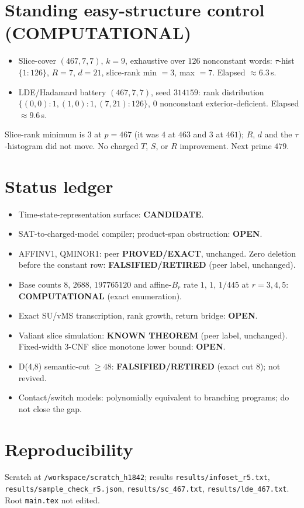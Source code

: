 \documentclass[11pt]{article}
\begin{document}
\section*{Standing easy-structure control (COMPUTATIONAL)}
\begin{itemize}
\item Slice-cover $(467,7,7)$, $k=9$, exhaustive over $126$ nonconstant words: $\tau$-hist $\{1{:}126\}$, $R=7$, $d=21$, slice-rank min $=3$, max $=7$. Elapsed $\approx6.3$\,s.
\item LDE/Hadamard battery $(467,7,7)$, seed $314159$: rank distribution $\{(0,0){:}1,(1,0){:}1,(7,21){:}126\}$, $0$ nonconstant exterior-deficient. Elapsed $\approx9.6$\,s.
\end{itemize}
Slice-rank minimum is $3$ at $p=467$ (it was $4$ at $463$ and $3$ at $461$); $R$, $d$ and the $\tau$-histogram did not move. No charged $T$, $S$, or $R$ improvement. Next prime $479$.

\section*{Status ledger}
\begin{itemize}
\item Time-state-representation surface: \textbf{CANDIDATE}.
\item SAT-to-charged-model compiler; product-span obstruction: \textbf{OPEN}.
\item AFFINV1, QMINOR1: peer \textbf{PROVED/EXACT}, unchanged. Zero deletion before the constant row: \textbf{FALSIFIED/RETIRED} (peer label, unchanged).
\item Base counts $8$, $2688$, $197765120$ and affine-$B_r$ rate $1$, $1$, $1/445$ at $r=3,4,5$: \textbf{COMPUTATIONAL} (exact enumeration).
\item Exact SU/vMS transcription, rank growth, return bridge: \textbf{OPEN}.
\item Valiant slice simulation: \textbf{KNOWN THEOREM} (peer label, unchanged). Fixed-width 3-CNF slice monotone lower bound: \textbf{OPEN}.
\item D(4,8) semantic-cut $\ge48$: \textbf{FALSIFIED/RETIRED} (exact cut 8); not revived.
\item Contact/switch models: polynomially equivalent to branching programs; do not close the gap.
\end{itemize}

\section*{Reproducibility}
Scratch at \texttt{/workspace/scratch\_h1842}; results \texttt{results/infoset\_r5.txt}, \texttt{results/sample\_check\_r5.json}, \texttt{results/sc\_467.txt}, \texttt{results/lde\_467.txt}. Root \texttt{main.tex} not edited.
\end{document}
